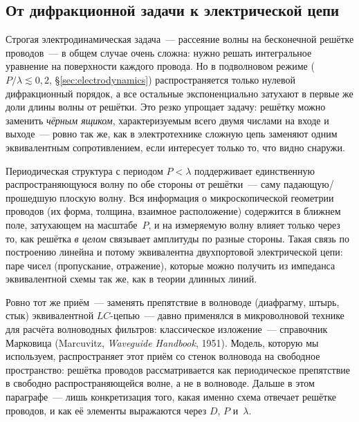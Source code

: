 \subsection{От дифракционной задачи к электрической цепи}
\label{subsec:circuit-idea}

\begin{intuition}
Строгая электродинамическая задача~--- рассеяние волны на бесконечной решётке проводов~--- в общем
случае очень сложна: нужно решать интегральное уравнение на поверхности каждого провода. Но в
подволновом режиме ($P/\lambda\lesssim0{,}2$, §\ref{sec:electrodynamics}) распространяется только
нулевой дифракционный порядок, а все остальные экспоненциально затухают в первые же доли длины
волны от решётки. Это резко упрощает задачу: решётку можно заменить \emph{чёрным ящиком},
характеризуемым всего двумя числами на входе и выходе~--- ровно так же, как в электротехнике
сложную цепь заменяют одним эквивалентным сопротивлением, если интересует только то, что видно
снаружи.
\end{intuition}

\begin{strict}
Периодическая структура с периодом $P<\lambda$ поддерживает единственную распространяющуюся волну
по обе стороны от решётки~--- саму падающую/прошедшую плоскую волну. Вся информация о микроскопической
геометрии проводов (их форма, толщина, взаимное расположение) содержится в ближнем поле,
затухающем на масштабе~$P$, и на измеряемую волну влияет только через то, как решётка
\emph{в целом} связывает амплитуды по разные стороны. Такая связь по построению линейна и потому
эквивалентна двухпортовой электрической цепи: паре чисел (пропускание, отражение), которые можно
получить из импеданса эквивалентной схемы так же, как в теории длинных линий.
\end{strict}

\begin{intuition}
Ровно тот же приём~--- заменять препятствие в волноводе (диафрагму, штырь, стык) эквивалентной
$LC$-цепью~--- давно применялся в микроволновой технике для расчёта волноводных фильтров:
классическое изложение~--- справочник Марковица (Marcuvitz, \emph{Waveguide Handbook}, 1951). Модель,
которую мы используем, распространяет этот приём со стенок волновода на свободное пространство:
решётка проводов рассматривается как периодическое препятствие в свободно распространяющейся
волне, а не в волноводе. Дальше в этом параграфе~--- лишь конкретизация того, какая именно схема
отвечает решётке проводов, и как её элементы выражаются через $D$, $P$ и~$\lambda$.
\end{intuition}

